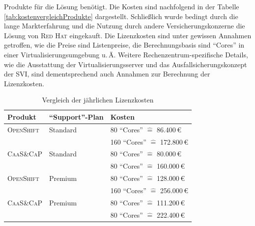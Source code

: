 Produkte für die Lösung benötigt. Die Kosten sind nachfolgend in der Tabelle \vref{tab:kostenvergleichProdukte} dargestellt. Schließlich wurde bedingt durch die lange Markterfahrung und die Nutzung durch andere Versicherungskonzerne die Lösung von \textsc{Red Hat} eingekauft. Die Lizenzkosten sind unter gewissen Annahmen getroffen, wie die Preise sind Listenpreise, die Berechnungsbasis sind \enquote{Cores} in einer Virtualisierungsumgebung u.\,Ä. Weitere Rechenzentrum-spezifische Details, wie die Ausstattung der Virtualisierungsserver und das Ausfallsicherungskonzept der \ac{SVI}, sind dementsprechend auch Annahmen zur Berechnung der Lizenzkosten.

\begin{table}[h!]
	\centering
	
	\begin{tabular}{@{}lll@{}}\toprule[1.5pt]
		
		\textbf{Produkt} & \textbf{\enquote{Support}-Plan} & \textbf{Kosten} \\ \midrule
		\textsc{OpenShift} & Standard & 80 \enquote{Cores} $\widehat{=}$  86.400\,€ \\
		& & 160 \enquote{Cores} $\widehat{=}$  172.800\,€ \\
		
		\textsc{CaaS}\&\textsc{CaP} & Standard & 80 \enquote{Cores} $\widehat{=}$  80.000\,€ \\
		& & 80 \enquote{Cores} $\widehat{=}$  160.000\,€ \\
		
		\textsc{OpenShift} & Premium & 80 \enquote{Cores} $\widehat{=}$  128.000\,€ \\
		& & 160 \enquote{Cores} $\widehat{=}$  256.000\,€ \\
		
		\textsc{CaaS}\&\textsc{CaP} & Premium & 80 \enquote{Cores} $\widehat{=}$  111.200\,€ \\
		& & 80 \enquote{Cores} $\widehat{=}$  222.400\,€ \\		
		
		\bottomrule[1.5pt]
	\end{tabular}
	
	\caption{Vergleich der jährlichen Lizenzkosten}
	\label{tab:kostenvergleichProdukte}
	
\end{table}

